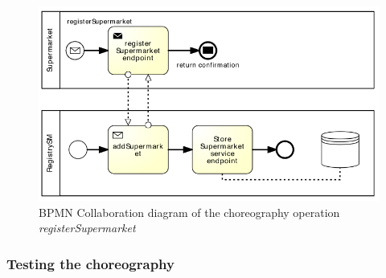 \begin{figure}[htbp]
\begin{center}
	\includegraphics{images/registerSupermarketworkflow}
\caption{BPMN Collaboration diagram of the choreography operation \emph{registerSupermarket}}
\label{registerSupermarketworkflow}
\end{center}
\end{figure}

\clearpage
\subsubsection{Testing the choreography}


